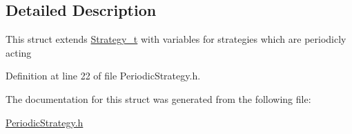 \subsection{Detailed Description}
This struct extends \hyperlink{structStrategy__t}{Strategy\_\-t} with variables for strategies which are periodicly acting 

Definition at line 22 of file PeriodicStrategy.h.



The documentation for this struct was generated from the following file:\begin{DoxyCompactItemize}
\item 
\hyperlink{PeriodicStrategy_8h}{PeriodicStrategy.h}\end{DoxyCompactItemize}
